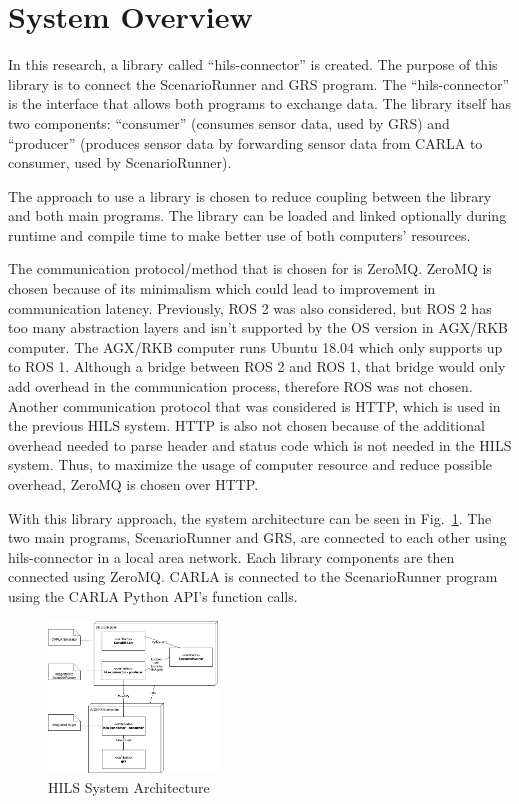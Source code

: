 \section{System Overview}

In this research, a library called ``hils-connector'' is created. The purpose of
this library is to connect the ScenarioRunner and GRS program. The
``hils-connector'' is the interface that allows both programs to exchange data.
The library itself has two components: ``consumer'' (consumes sensor data, used
by GRS) and ``producer'' (produces sensor data by forwarding sensor data from
CARLA to consumer, used by ScenarioRunner).

The approach to use a library is chosen to reduce coupling between the library
and both main programs. The library can be loaded and linked optionally during
runtime and compile time to make better use of both computers' resources.

The communication protocol/method that is chosen for is ZeroMQ. ZeroMQ is chosen
because of its minimalism which could lead to improvement in communication
latency. Previously, ROS 2 was also considered, but ROS 2 has too many
abstraction layers and isn't supported by the OS version in AGX/RKB computer.
The AGX/RKB computer runs Ubuntu 18.04 which only supports up to ROS 1. Although
a bridge between ROS 2 and ROS 1, that bridge would only add overhead in the
communication process, therefore ROS was not chosen. Another communication
protocol that was considered is HTTP, which is used in the previous HILS system.
HTTP is also not chosen because of the additional overhead needed to parse
header and status code which is not needed in the HILS system. Thus, to maximize
the usage of computer resource and reduce possible overhead, ZeroMQ is chosen
over HTTP.

With this library approach, the system architecture can be seen in
Fig.~\ref{section-3-hils-deployment-diagram}. The two main programs,
ScenarioRunner and GRS, are connected to each other using hils-connector in a
local area network. Each library components are then connected using ZeroMQ.
CARLA is connected to the ScenarioRunner program using the CARLA Python API's
function calls.

\begin{figure}[htbp]
	\centerline{\includegraphics[width=0.4\textwidth]{resources/chapter-3/deployment-diagram-new-hils-EN.png}}
	\caption{HILS System Architecture}
	\label{section-3-hils-deployment-diagram}
\end{figure}

